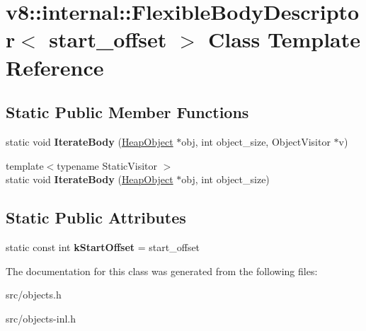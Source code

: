 \hypertarget{classv8_1_1internal_1_1_flexible_body_descriptor}{}\section{v8\+:\+:internal\+:\+:Flexible\+Body\+Descriptor$<$ start\+\_\+offset $>$ Class Template Reference}
\label{classv8_1_1internal_1_1_flexible_body_descriptor}
\subsection*{Static Public Member Functions}
\begin{DoxyCompactItemize}
\item 
\hypertarget{classv8_1_1internal_1_1_flexible_body_descriptor_a389dbb15f0cf8b50a2e3a9fcff68b3cc}{}static void {\bfseries Iterate\+Body} (\hyperlink{classv8_1_1internal_1_1_heap_object}{Heap\+Object} $\ast$obj, int object\+\_\+size, Object\+Visitor $\ast$v)\label{classv8_1_1internal_1_1_flexible_body_descriptor_a389dbb15f0cf8b50a2e3a9fcff68b3cc}

\item 
\hypertarget{classv8_1_1internal_1_1_flexible_body_descriptor_a3b1c7942fbed459c907d8a72c40c3e9b}{}{\footnotesize template$<$typename Static\+Visitor $>$ }\\static void {\bfseries Iterate\+Body} (\hyperlink{classv8_1_1internal_1_1_heap_object}{Heap\+Object} $\ast$obj, int object\+\_\+size)\label{classv8_1_1internal_1_1_flexible_body_descriptor_a3b1c7942fbed459c907d8a72c40c3e9b}

\end{DoxyCompactItemize}
\subsection*{Static Public Attributes}
\begin{DoxyCompactItemize}
\item 
\hypertarget{classv8_1_1internal_1_1_flexible_body_descriptor_a27ad85d165e2d35360cf5150db132825}{}static const int {\bfseries k\+Start\+Offset} = start\+\_\+offset\label{classv8_1_1internal_1_1_flexible_body_descriptor_a27ad85d165e2d35360cf5150db132825}

\end{DoxyCompactItemize}


The documentation for this class was generated from the following files\+:\begin{DoxyCompactItemize}
\item 
src/objects.\+h\item 
src/objects-\/inl.\+h\end{DoxyCompactItemize}

